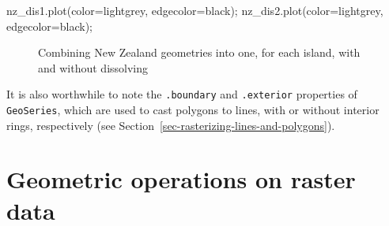 \documentclass[
  letterpaper,
]{krantz}
\newenvironment{Shaded}{\begin{snugshade}}{\end{snugshade}}
\newcommand{\NormalTok}[1]{\textcolor[rgb]{0.00,0.23,0.31}{#1}}
\newcommand{\OperatorTok}[1]{\textcolor[rgb]{0.37,0.37,0.37}{#1}}
\newcommand{\StringTok}[1]{\textcolor[rgb]{0.13,0.47,0.30}{#1}}
\begin{document}
\begin{Shaded}
\begin{Highlighting}[]
\NormalTok{nz\_dis1.plot(color}\OperatorTok{=}\StringTok{\textquotesingle{}lightgrey\textquotesingle{}}\NormalTok{, edgecolor}\OperatorTok{=}\StringTok{\textquotesingle{}black\textquotesingle{}}\NormalTok{)}\OperatorTok{;}
\NormalTok{nz\_dis2.plot(color}\OperatorTok{=}\StringTok{\textquotesingle{}lightgrey\textquotesingle{}}\NormalTok{, edgecolor}\OperatorTok{=}\StringTok{\textquotesingle{}black\textquotesingle{}}\NormalTok{)}\OperatorTok{;}
\end{Highlighting}
\end{Shaded}

\begin{figure}

\begin{minipage}{0.50\linewidth}



\end{minipage}%
%
\begin{minipage}{0.50\linewidth}



\end{minipage}%

\caption{\label{fig-combine-geoms}Combining New Zealand geometries into
one, for each island, with and without dissolving}

\end{figure}%

It is also worthwhile to note the \texttt{.boundary} and
\texttt{.exterior} properties of \texttt{GeoSeries}, which are used to
cast polygons to lines, with or without interior rings, respectively
(see Section~\ref{sec-rasterizing-lines-and-polygons}).

\section{Geometric operations on raster data}\label{sec-geo-ras}
\end{document}
